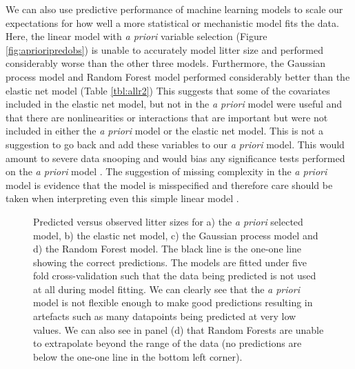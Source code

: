 \documentclass[12pt,]{article}
\begin{document}
We can also use predictive performance of machine learning models to scale our expectations for how well a more statistical or mechanistic model fits the data.
Here, the linear model with \emph{a priori} variable selection (Figure \ref{fig:aprioripredobs}) is unable to accurately model litter size and performed considerably worse than the other three models.
Furthermore, the Gaussian process model and Random Forest model performed considerably better than the elastic net model (Table \ref{tbl:allr2})
This suggests that some of the covariates included in the elastic net model, but not in the \emph{a priori} model were useful and that there are nonlinearities or interactions that are important but were not included in either the \emph{a priori} model or the elastic net model.
This is not a suggestion to go back and add these variables to our \emph{a priori} model.
This would amount to severe data snooping and would bias any significance tests performed on the \emph{a priori} model \citep{white2000reality}.
The suggestion of missing complexity in the \emph{a priori} model is evidence that the model is misspecified and therefore care should be taken when interpreting even this simple linear model \citep{lyddon2018nonparametric, maldonado1993interpreting}. 



\begin{figure}[t!]
  \centering

  \label{fig:predobs}
  \caption{
    Predicted versus observed litter sizes for a) the \emph{a priori} selected model, b) the elastic net model, c) the Gaussian process model and d) the Random Forest model.
    The black line is the one-one line showing the correct predictions.
    The models are fitted under five fold cross-validation such that the data being predicted is not used at all during model fitting.
    We can clearly see that the \emph{a priori} model is not flexible enough to make good predictions resulting in artefacts such as many datapoints being predicted at very low values.
    We can also see in panel (d) that Random Forests are unable to extrapolate beyond the range of the data (no predictions are below the one-one line in the bottom left corner).
  }
\end{figure}
\end{document}
